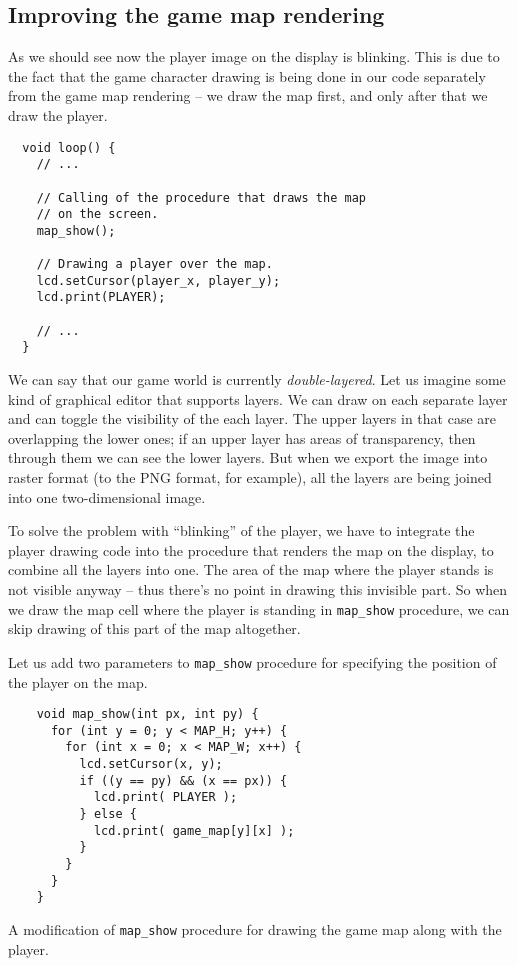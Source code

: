 \documentclass[../sparc.tex]{subfiles}
\begin{document}
\subsection{Improving the game map rendering}

As we should see now the player image on the display is blinking.  This is due
to the fact that the game character drawing is being done in our code separately
from the game map rendering -- we draw the map first, and only after that we draw
the player.

\begin{verbatim}
  void loop() {
    // ...

    // Calling of the procedure that draws the map
    // on the screen.
    map_show();

    // Drawing a player over the map.
    lcd.setCursor(player_x, player_y);
    lcd.print(PLAYER);

    // ...
  }
\end{verbatim}

We can say that our game world is currently \emph{double-layered}.  Let us
imagine some kind of graphical editor that supports layers.  We can draw on each
separate layer and can toggle the visibility of the each layer.  The upper
layers in that case are overlapping the lower ones; if an upper layer has areas
of transparency, then through them we can see the lower layers.  But when we
export the image into raster format (to the PNG format, for example), all the
layers are being joined into one two-dimensional image.

To solve the problem with ``blinking'' of the player, we have to integrate the
player drawing code into the procedure that renders the map on the display, to
combine all the layers into one.  The area of the map where the player stands is
not visible anyway -- thus there's no point in drawing this invisible part.  So
when we draw the map cell where the player is standing in
\texttt{map_show} procedure, we can skip drawing of this part of the
map altogether.

Let us add two parameters to \texttt{map_show} procedure for specifying
the position of the player on the map.

\begin{listing}[H]
  \begin{verbatim}
    void map_show(int px, int py) {
      for (int y = 0; y < MAP_H; y++) {
        for (int x = 0; x < MAP_W; x++) {
          lcd.setCursor(x, y);
          if ((y == py) && (x == px)) {
            lcd.print( PLAYER );
          } else {
            lcd.print( game_map[y][x] );
          }
        }
      }
    }
  \end{verbatim}
  \caption{A modification of \texttt{map_show} procedure for drawing
    the game map along with the player.}
  \label{listing:game-dev-map-show-improvement}
\end{listing}
\end{document}
